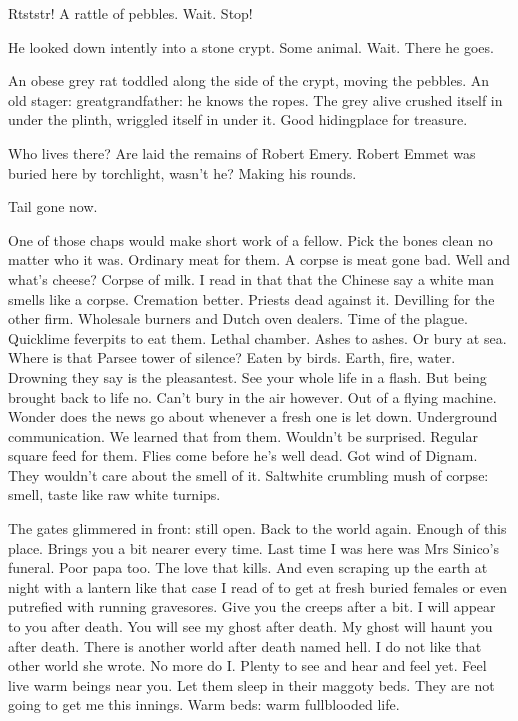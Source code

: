 Rtststr!
A rattle of pebbles.
Wait.
Stop!

He looked down intently into a stone crypt.
Some animal.
Wait.
There he goes.

An obese grey rat toddled along the side of the crypt, moving the pebbles.
An old stager:
greatgrandfather:
he knows the ropes.
The grey alive crushed itself in under the plinth,
wriggled itself in under it.
Good hidingplace for treasure.

Who lives there?
Are laid the remains of Robert Emery.
Robert Emmet was buried here by torchlight, wasn't he?
Making his rounds.

Tail gone now.

One of those chaps would make short work of a fellow.
Pick the bones clean no matter who it was.
Ordinary meat for them.
A corpse is meat gone bad.
Well and what's cheese?
Corpse of milk.
I read in that 
that the Chinese say a white man smells like a corpse.
Cremation better.
Priests dead against it.
Devilling for the other firm.
Wholesale burners and Dutch oven dealers.
Time of the plague.
Quicklime feverpits to eat them.
Lethal chamber.
Ashes to ashes.
Or bury at sea.
Where is that Parsee tower of silence?
Eaten by birds.
Earth, fire, water.
Drowning they say is the pleasantest.
See your whole life in a flash.
But being brought back to life no.
Can't bury in the air however.
Out of a flying machine.
Wonder does the news go about whenever a fresh one is let down.
Underground communication.
We learned that from them.
Wouldn't be surprised.
Regular square feed for them.
Flies come before he's well dead.
Got wind of Dignam.
They wouldn't care about the smell of it.
Saltwhite crumbling mush of corpse:
smell, taste like raw white turnips.

The gates glimmered in front:
still open.
Back to the world again.
Enough of this place.
Brings you a bit nearer every time.
Last time I was here was Mrs Sinico's funeral.
Poor papa too.
The love that kills.
And even scraping up the earth at night with a lantern
like that case I read of
to get at fresh buried females
or even putrefied with running gravesores.
Give you the creeps after a bit.
I will appear to you after death.
You will see my ghost after death.
My ghost will haunt you after death.
There is another world after death named hell.
I do not like that other world she wrote.
No more do I.
Plenty to see and hear and feel yet.
Feel live warm beings near you.
Let them sleep in their maggoty beds.
They are not going to get me this innings.
Warm beds:
warm fullblooded life.

